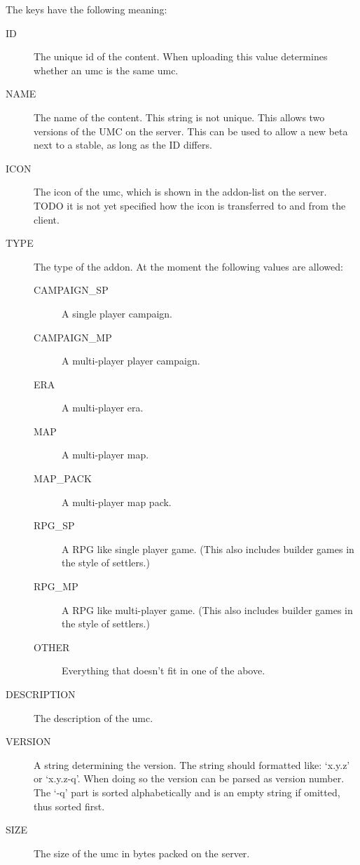 The keys have the following meaning:
\begin{description}
\item[ID]
	The unique id of the content. When uploading this value determines
	whether an umc is the same umc.

\item[NAME]
	The name of the content. This string is not unique. This allows two
	versions of the UMC on the server. This can be used to allow a new beta
	next to a stable, as long as the ID differs.

\item[ICON]
	The icon of the umc, which is shown in the addon-list on the server.
	TODO it is not yet specified how the icon is transferred to and from the
	client.

\item[TYPE]
	The type of the addon. At the moment the following values are allowed:
	\begin{description}
	\item[CAMPAIGN\_SP] A single player campaign.
	\item[CAMPAIGN\_MP] A multi-player player campaign.
	\item[ERA] A multi-player era.
	\item[MAP] A multi-player map.
	\item[MAP\_PACK] A multi-player map pack.
	\item[RPG\_SP]
		A RPG like single player game. (This also includes builder games in
		the style of settlers.)

	\item[RPG\_MP]
		A RPG like multi-player game. (This also includes builder games in
		the style of settlers.)

	\item[OTHER] Everything that doesn't fit in one of the above.
	\end{description}

\item[DESCRIPTION]
	The description of the umc.

\item[VERSION]
	A string determining the version. The string should formatted like:
	`x.y.z' or `x.y.z-q'. When doing so the version can be parsed as version
	number. The `-q' part is sorted alphabetically and is an empty string if
	omitted, thus sorted first.

\item[SIZE]
	The size of the umc in bytes packed on the server.


\end{description}
